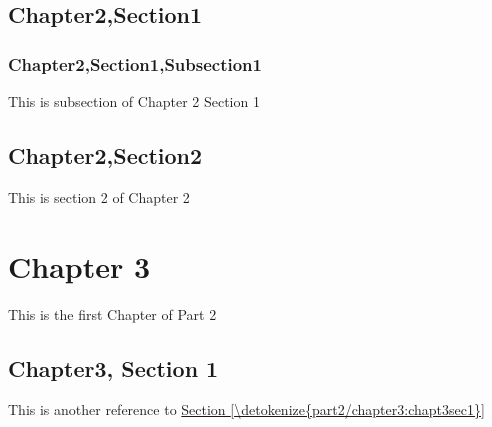 \documentclass[letterpaper,10pt,english]{sphinxmanual}
\begin{document}
\section{Chapter2,Section1}
\label{\detokenize{part1/chapter2:chapter2-section1}}

\subsection{Chapter2,Section1,Subsection1}
\label{\detokenize{part1/chapter2:chapter2-section1-subsection1}}
This is subsection of Chapter 2 Section 1


\section{Chapter2,Section2}
\label{\detokenize{part1/chapter2:chapter2-section2}}
This is section 2 of Chapter 2


\chapter{Chapter 3}
\label{\detokenize{part2/chapter3:chapter-3}}\label{\detokenize{part2/chapter3::doc}}
This is the first Chapter of Part 2


\section{Chapter3, Section 1}
\label{\detokenize{part2/chapter3:chapter3-section-1}}\label{\detokenize{part2/chapter3:chapt3sec1}}
This is another reference to \hyperref[\detokenize{part2/chapter3:chapt3sec1}]{Section \ref{\detokenize{part2/chapter3:chapt3sec1}}}







\renewcommand{\indexname}{Index}
\printindex
\end{document}
